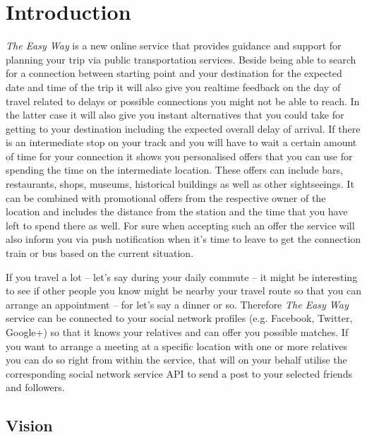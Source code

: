 \documentclass[a4paper]{article}
\begin{document}
\section{Introduction} %
\label{sec:introduction}

\textit{The Easy Way} is a new online service that provides guidance and support for planning your trip via public transportation services. Beside being able to search for a connection between starting point and your destination for the expected date and time of the trip it will also give you real­time feedback on the day of travel related to delays or possible connections you might not be able to reach. In the latter case it will also give you instant alternatives that you could take for getting to your destination including the expected overall delay of arrival. If there is an intermediate stop on your track and you will have to wait a certain amount of time for your connection it shows you personalised offers that you can use for spending the time on the intermediate location. These offers  can  include  bars, restaurants, shops, museums, historical buildings as well as other sightseeings.  It  can  be  combined  with  promotional  offers  from the respective owner of the location and includes the distance from the station and the time that you have left to spend there as  well.  For  sure  when  accepting  such  an  offer  the  service  will  also  inform you via push notification  when  it’s  time  to  leave  to get the connection train or bus based on the current situation. \par \vspace{0.2cm}
If you travel a lot --­ let’s say during your daily commute --­ it might be interesting to see if other people you know might be nearby your travel route so that you can arrange an appointment -- for let’s say a dinner or so. Therefore \textit{The Easy Way} service can be connected to your social network profiles (e.g. Facebook, Twitter, Google+) so that it knows your relatives and can offer you possible matches. If you want to arrange a meeting at a specific location with one or more relatives you can do so right from within the service, that will on your behalf utilise the corresponding social network service API to send a post to your selected friends and followers.

\subsection{Vision}
\label{subsec:vision}
\end{document}
